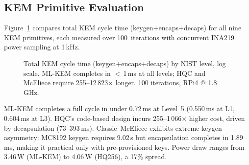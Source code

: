 \subsection{KEM Primitive Evaluation}
\label{sec:kem}

Figure~\ref{fig:kem_cost} compares total KEM cycle time
(keygen+encaps+decaps) for all nine KEM primitives, each measured over
100~iterations with concurrent INA219 power sampling at 1\,kHz.

\begin{figure}[t]
\centering
{}
\caption{Total KEM cycle time (keygen+encaps+decaps) by NIST level,
  log scale.  ML-KEM completes in $<$\,1\,ms at all levels; HQC and
  McEliece require 255--12\,823$\times$ longer.  100 iterations,
  RPi4 @ 1.8\,GHz.}
\label{fig:kem_cost}
\end{figure}

ML-KEM completes a full cycle in under 0.72\,ms at Level~5
(0.550\,ms at L1, 0.604\,ms at L3).  HQC's code-based design incurs
255--1\,066$\times$ higher cost, driven by decapsulation (73--393\,ms).
Classic~McEliece exhibits extreme keygen asymmetry: MC8192 keygen
requires 9.02\,s but encapsulation completes in 1.89\,ms,
making it practical only with pre-provisioned keys.
Power draw ranges from 3.46\,W (ML-KEM) to 4.06\,W (HQ256),
a 17\% spread.

